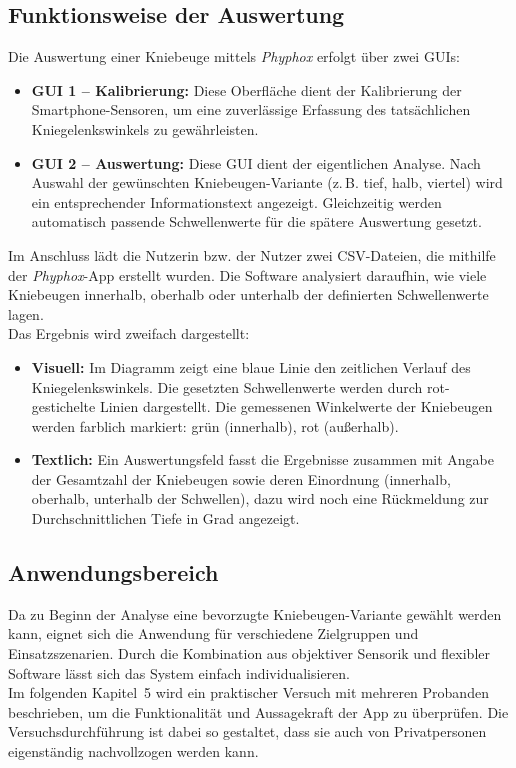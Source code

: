 \subsection{Funktionsweise der Auswertung}

\noindent Die Auswertung einer Kniebeuge mittels \textit{Phyphox} erfolgt über zwei GUIs:

\begin{itemize}
  \item \textbf{GUI 1 – Kalibrierung:} Diese Oberfläche dient der Kalibrierung der Smartphone-Sensoren, um eine zuverlässige Erfassung des tatsächlichen Kniegelenkswinkels zu gewährleisten. 
  \item \textbf{GUI 2 – Auswertung:} Diese GUI dient der eigentlichen Analyse. Nach Auswahl der gewünschten Kniebeugen-Variante (z.\,B. tief, halb, viertel) wird ein entsprechender Informationstext angezeigt. Gleichzeitig werden automatisch passende Schwellenwerte für die spätere Auswertung gesetzt.
\end{itemize}

\noindent Im Anschluss lädt die Nutzerin bzw. der Nutzer zwei CSV-Dateien, die mithilfe der \textit{Phyphox}-App erstellt wurden. Die Software analysiert daraufhin, wie viele Kniebeugen innerhalb, oberhalb oder unterhalb der definierten Schwellenwerte lagen. 
\\
\noindent Das Ergebnis wird zweifach dargestellt:
\begin{itemize}
    \item \textbf{Visuell:} Im Diagramm zeigt eine blaue Linie den zeitlichen Verlauf des Kniegelenkswinkels. Die gesetzten Schwellenwerte werden durch rot-gestichelte Linien dargestellt. Die gemessenen Winkelwerte der Kniebeugen werden farblich markiert: grün (innerhalb), rot (außerhalb).
    \item \textbf{Textlich:} Ein Auswertungsfeld fasst die Ergebnisse zusammen mit Angabe der Gesamtzahl der Kniebeugen sowie deren Einordnung (innerhalb, oberhalb, unterhalb der Schwellen), dazu wird noch eine Rückmeldung zur Durchschnittlichen Tiefe in Grad angezeigt. 
\end{itemize}

\subsection{Anwendungsbereich}

\noindent Da zu Beginn der Analyse eine bevorzugte Kniebeugen-Variante gewählt werden kann, eignet sich die Anwendung für verschiedene Zielgruppen und Einsatzszenarien. Durch die Kombination aus objektiver Sensorik und flexibler Software lässt sich das System einfach individualisieren.
\\
\noindent
Im folgenden Kapitel~5 wird ein praktischer Versuch mit mehreren Probanden beschrieben, um die Funktionalität und Aussagekraft der App zu überprüfen. Die Versuchsdurchführung ist dabei so gestaltet, dass sie auch von Privatpersonen eigenständig nachvollzogen werden kann.